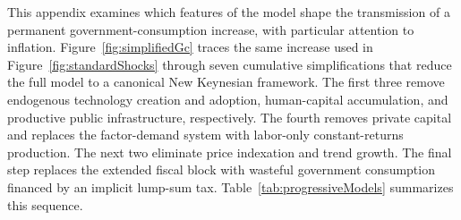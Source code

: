 \documentclass[a4paper,11pt]{article}
\begin{document}
This appendix examines which features of the model shape the transmission of a permanent government-consumption increase, with particular attention to inflation.
Figure~\ref{fig:simplifiedGc} traces the same increase used in Figure~\ref{fig:standardShocks} through seven cumulative simplifications that reduce the full model to a canonical New Keynesian framework.
The first three remove endogenous technology creation and adoption, human-capital accumulation, and productive public infrastructure, respectively.
The fourth removes private capital and replaces the factor-demand system with labor-only constant-returns production.
The next two eliminate price indexation and trend growth.
The final step replaces the extended fiscal block with wasteful government consumption financed by an implicit lump-sum tax.
Table~\ref{tab:progressiveModels} summarizes this sequence.
\end{document}
